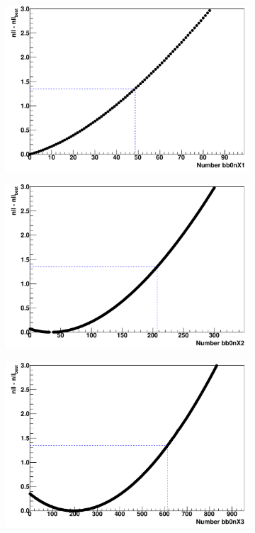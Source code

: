 \documentclass[herrin-thesis.tex]{subfiles}
\begin{document}
\begin{figure}[htb]
\centering
	\begin{subfigure}[c]{0.48\textwidth}
	\centering
	\includegraphics[width=\textwidth]{./plots/analysis_bb0nX1_profile.pdf}
	\end{subfigure}\hfill%
	\begin{subfigure}[c]{0.48\textwidth}
	\centering
	\includegraphics[width=\textwidth]{./plots/analysis_bb0nX2_profile.pdf}
	\end{subfigure}
	\begin{subfigure}[c]{0.48\textwidth}
	\centering
	\includegraphics[width=\textwidth]{./plots/analysis_bb0nX3_profile.pdf}

\end{subfigure}
\end{figure}
\end{document}
